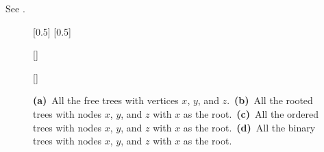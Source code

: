 See .
\begin{figure}[!htb]
    \subcaptionbox{\label{fig:B.5-1a}}[0.5\textwidth]{}
    \subcaptionbox{\label{fig:B.5-1b}}[0.5\textwidth]{}
    \par\vspace{10mm}
    \subcaptionbox{\label{fig:B.5-1c}}[\textwidth]{}
    \par\vspace{10mm}
    \subcaptionbox{\label{fig:B.5-1d}}[\textwidth]{}
    \caption{\textbf{(a)}\, All the free trees with vertices $x$, $y$, and $z$.\,
    \textbf{(b)}\, All the rooted trees with nodes $x$, $y$, and $z$ with $x$ as the root.\,
    \textbf{(c)}\, All the ordered trees with nodes $x$, $y$, and $z$ with $x$ as the root.\,
    \textbf{(d)}\, All the binary trees with nodes $x$, $y$, and $z$ with $x$ as the root.} \label{fig:B.5-1}
\end{figure}
